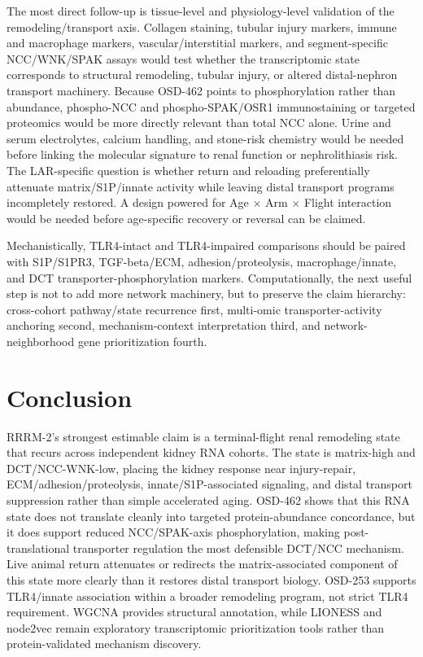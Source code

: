 \documentclass[11pt]{article}
\begin{document}
The most direct follow-up is tissue-level and physiology-level validation of the remodeling/transport axis. Collagen staining, tubular injury markers, immune and macrophage markers, vascular/interstitial markers, and segment-specific NCC/WNK/SPAK assays would test whether the transcriptomic state corresponds to structural remodeling, tubular injury, or altered distal-nephron transport machinery. Because OSD-462 points to phosphorylation rather than abundance, phospho-NCC and phospho-SPAK/OSR1 immunostaining or targeted proteomics would be more directly relevant than total NCC alone. Urine and serum electrolytes, calcium handling, and stone-risk chemistry would be needed before linking the molecular signature to renal function or nephrolithiasis risk. The LAR-specific question is whether return and reloading preferentially attenuate matrix/S1P/innate activity while leaving distal transport programs incompletely restored. A design powered for Age $\times$ Arm $\times$ Flight interaction would be needed before age-specific recovery or reversal can be claimed.

Mechanistically, TLR4-intact and TLR4-impaired comparisons should be paired with S1P/S1PR3, TGF-beta/ECM, adhesion/proteolysis, macrophage/innate, and DCT transporter-phosphorylation markers. Computationally, the next useful step is not to add more network machinery, but to preserve the claim hierarchy: cross-cohort pathway/state recurrence first, multi-omic transporter-activity anchoring second, mechanism-context interpretation third, and network-neighborhood gene prioritization fourth.

\section{Conclusion}

RRRM-2's strongest estimable claim is a terminal-flight renal remodeling state that recurs across independent kidney RNA cohorts. The state is matrix-high and DCT/NCC-WNK-low, placing the kidney response near injury-repair, ECM/adhesion/proteolysis, innate/S1P-associated signaling, and distal transport suppression rather than simple accelerated aging. OSD-462 shows that this RNA state does not translate cleanly into targeted protein-abundance concordance, but it does support reduced NCC/SPAK-axis phosphorylation, making post-translational transporter regulation the most defensible DCT/NCC mechanism. Live animal return attenuates or redirects the matrix-associated component of this state more clearly than it restores distal transport biology. OSD-253 supports TLR4/innate association within a broader remodeling program, not strict TLR4 requirement. WGCNA provides structural annotation, while LIONESS and node2vec remain exploratory transcriptomic prioritization tools rather than protein-validated mechanism discovery.
\end{document}
